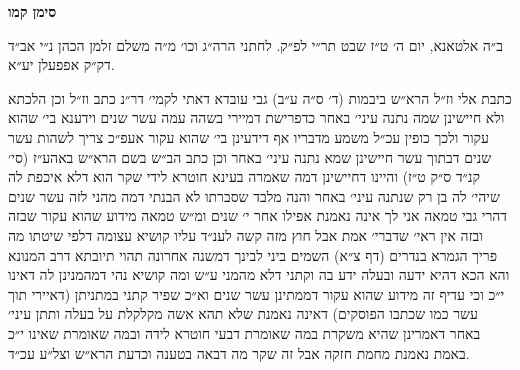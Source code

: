 \documentclass[12pt, openany]{book}
\newcommand{\chapname}{}
\newcommand{\newchap}[1]{
	\addcontentsline{toc}{chapter}{#1}
	\renewcommand{\chapname}{#1}
		\begin{center}
			\textbf{%
\fontsize{16pt}{16pt}\selectfont
				#1}
		\end{center}
}
\begin{document}
\newchap{סימן קמו}
\begin{multicols}{2}
ב״ה אלטאנא, יום ה׳ ט״ז שבט תר״י לפ״ק. לחתני הרה״ג וכו׳ מ״ה משלם זלמן הכהן נ״י אב״ד דק״ק אפפעלן יע״א.\\\vspace{0pt}

כתבת אלי וז״ל הרא״ש ביבמות (ד׳ ס״ה ע״ב) גבי עובדא דאתי לקמי׳ דר״נ כתב וז״ל וכן הלכתא ולא חיישינן שמה נתנה עיני׳ באחר כדפרישת דמיירי בשהה עמה עשר שנים וידענא בי׳ שהוא עקור ולכך כופין עכ״ל משמע מדבריו אף דידעינן בי׳ שהוא עקור אעפ״כ צריך לשהות עשר שנים דבתוך עשר חיישינן שמא נתנה עיני׳ באחר וכן כתב הב״ש בשם הרא״ש באהע״ז (סי׳ קנ״ד ס״ק ט״ז) והיינו דחיישינן דמה שאמרה בעינא חוטרא לידי שקר הוא דלא איכפת לה שיהי׳ לה בן רק שנתנה עיני׳ באחר והנה מלבד שסברתו לא הבנתי דמה מהני לזה עשר שנים דהרי גבי טמאה אני לך אינה נאמנת אפילו אחר י׳ שנים ומ״ש טמאה מידוע שהוא עקור שבזה ובזה אין ראי׳ שדברי׳ אמת אבל חוץ מזה קשה לענ״ד עליו קושיא עצומה דלפי שיטתו מה פריך הגמרא בנדרים (דף צ״א) השמים ביני לבינך דמשנה אחרונה תהוי תיובתא דרב המנונא והא הכא דהיא ידעה ובעלה ידע בה וקתני דלא מהמני ע״ש ומה קושיא נהי דמהמנינן לה דאינו י״כ וכי עדיף זה מידוע שהוא עקור דממתינן עשר שנים וא״כ שפיר קתני במתניתן (דאיירי תוך עשר כמו שכתבו הפוסקים) דאינה נאמנת שלא תהא אשה מקלקלת על בעלה ותתן עיני׳ באחר דאמרינן שהיא משקרת במה שאומרת דבעי חוטרא לידה ובמה שאומרת שאינו י״כ באמת נאמנת מחמת חזקה אבל זה שקר מה דבאה בטענה וכדעת הרא״ש וצל״ע עכ״ד.\\\vspace{0pt}


\end{multicols}
\end{document}
